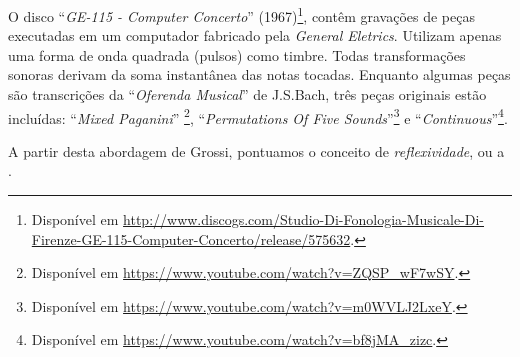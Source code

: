 O  disco ``\emph{GE-115 - Computer Concerto}'' (1967)\footnote{Disponível em \url{http://www.discogs.com/Studio-Di-Fonologia-Musicale-Di-Firenze-GE-115-Computer-Concerto/release/575632}.},  contêm gravações de peças executadas em um computador fabricado pela \emph{General Eletrics}. Utilizam apenas uma forma de onda quadrada (pulsos) como timbre. Todas transformações sonoras derivam da soma instantânea das notas tocadas. Enquanto algumas peças são transcrições da ``\emph{Oferenda Musical}'' de J.S.Bach, três peças originais estão incluídas: ``\emph{Mixed Paganini}'' \footnote{Disponível em \url{https://www.youtube.com/watch?v=ZQSP_wF7wSY}.}, ``\emph{Permutations Of Five Sounds}''\footnote{Disponível em \url{https://www.youtube.com/watch?v=m0WVLJ2LxeY}.} e ``\emph{Continuous}''\footnote{Disponível em \url{https://www.youtube.com/watch?v=bf8jMA_zizc}.}. 


A partir desta abordagem de Grossi, pontuamos o conceito de \emph{reflexividade}, ou a . 


